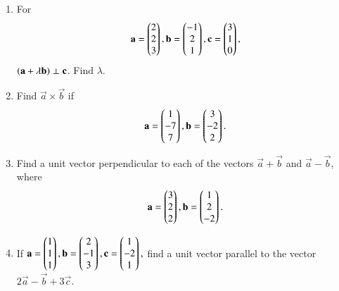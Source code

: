 \begin{enumerate}[label=\arabic*.,ref=\thesubsection.\theenumi]
\item For 
\begin{align}
\mathbf{a} = \begin{pmatrix}2\\2\\3\end{pmatrix}, \mathbf{b} = \begin{pmatrix}-1\\2\\1\end{pmatrix}, \mathbf{c} = \begin{pmatrix}3\\1\\0\end{pmatrix},
\end{align}
$\left(\mathbf{a}+\lambda\mathbf{b}\right)\perp\mathbf{c}$.  Find $\lambda$.
\item Find ${\vec{a} \times \vec{b}}$ if 
\begin{align}
\mathbf{a}=\begin{pmatrix}1\\-7\\7\end{pmatrix},
\mathbf{b}=\begin{pmatrix}3\\-2\\2\end{pmatrix}.
\end{align}
\item Find a unit vector perpendicular to each of the vectors 
$\vec{a}+\vec{b}$ and $\vec{a}-\vec{b}$, where 
\begin{align}
\mathbf{a}=\begin{pmatrix}3\\2\\2\end{pmatrix},
\mathbf{b}=\begin{pmatrix}1\\2\\-2\end{pmatrix}.
\end{align}
\item  If 
$
\mathbf{a}=\begin{pmatrix}1\\1\\1\end{pmatrix},
\mathbf{b}=\begin{pmatrix}2\\-1\\3\end{pmatrix},
\mathbf{c}=\begin{pmatrix}1\\-2\\1\end{pmatrix},
$
find a unit vector parallel to the vector $2\vec{a}-\vec{b}+3\vec{c}$.
\\
\solution 



\end{enumerate}
